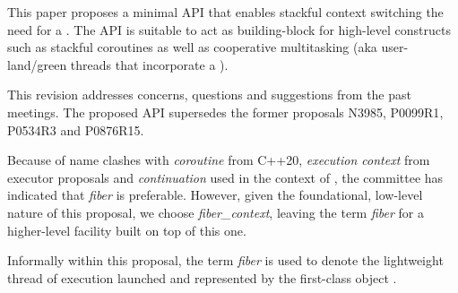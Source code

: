 \label{abstract}

This paper proposes a
minimal API that enables stackful context switching  the need for a
. The API is suitable to act as building-block for high-level
constructs such as stackful coroutines as well as cooperative multitasking
(aka user-land/green threads that incorporate a ).

This revision addresses concerns, questions and suggestions from the past meetings.
The proposed API supersedes the former proposals N3985\cite{N3985},
P0099R1\cite{P0099R1}, P0534R3\cite{P0534R3} and P0876R15\cite{P0876R15}.

Because of name clashes with \emph{coroutine} from C++20,
\emph{execution context} from executor proposals and \emph{continuation} used
in the context of , the committee has indicated
that \emph{fiber} is preferable. However, given the foundational, low-level
nature of this proposal, we choose \emph{fiber\_context}, leaving the
term \emph{fiber} for a higher-level facility built on top of this one.

Informally within this proposal, the term \emph{fiber} is used to denote the
lightweight thread of execution launched and represented by the first-class
object \fiber.
